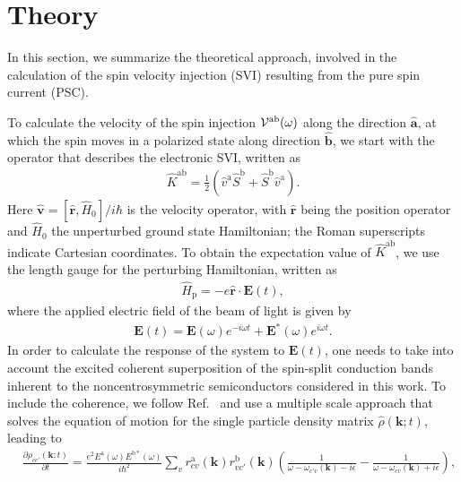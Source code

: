 \documentclass[floatfix,prb,aps,superscriptaddress,showpacs,11pt,preprint,letterpaper]{revtex4}
\begin{document}
\section{Theory}
\label{sec:theory}

In this section, we  summarize the theoretical approach, involved in the
calculation of the spin velocity injection (SVI) resulting from the pure spin
current (PSC).
 
To calculate the velocity of the spin injection
${\cal V}^{\mathrm{a}\mathrm{b}}(\omega)$ along the direction $\hat{\mathbf{a}}$, at
which the spin moves in a
polarized state along direction $\hat{\mathbf{b}}$,
we start with the operator that describes the electronic SVI, written as
\begin{align}\label{z.1}
\hat K^{\mathrm{a}\mathrm{b}} = 
\frac{1}{2}\left( \hat v^\mathrm{a} \hat S^\mathrm{b} 
+\hat  S^\mathrm{b} \hat v^\mathrm{a}\right) 
.
\end{align} 
Here $\hat{\mathbf v}=[\hat{\mathbf r},\hat H_0]/i\hbar$ 
is the velocity operator, with
$\hat {\mathbf r}$ 
being the position operator and $\hat H_0$ the unperturbed
ground state Hamiltonian; 
the Roman superscripts  indicate Cartesian coordinates. 
To obtain the expectation value of 
$\hat K^{\mathrm{a}\mathrm{b}}$, we use the length gauge for the perturbing
Hamiltonian, written as
\begin{align}\label{z.2}
\hat H_{\text{p}}=-e\hat{\mathbf r}\cdot{\mathbf E}(t)
,
\end{align}   
where the applied electric field of the beam of light is given by
\begin{align}\label{z.3}
{\mathbf E}(t) = 
{\mathbf E}(\omega)e^{-i\omega t} + {\mathbf E}^*(\omega)e^{i\omega t}
.
\end{align}
In order to calculate the response of the system to ${\mathbf E}(t)$, one needs
to take into account the excited coherent superposition of the spin-split
conduction bands inherent to the noncentrosymmetric semiconductors considered
in this work. 
To include the coherence, we follow Ref.~
and use a multiple scale approach that solves the equation of motion for the
single particle density matrix 
$\hat{\rho}({\mathbf k};t)$,  
leading to
\begin{align}\label{z.4}
&\frac{\partial \rho_{cc'}({\mathbf k;t})}{\partial t} =
\frac{e^{2}E^{\mathrm{a}}(\omega)E^{\mathrm{b*}}(\omega)}
{i \hbar^{2}}
\sum_{v}r^{\mathrm{a}}_{cv}({\mathbf k}) r^{\mathrm{b}}_{vc'}({\mathbf k})
\left( \frac{1}{\omega - \omega_{c'v}({\mathbf k}) - i \epsilon} 
- 
\frac{1}{\omega - \omega_{cv}({\mathbf k}) + i \epsilon} \right)
,
\end{align}
\end{document}
